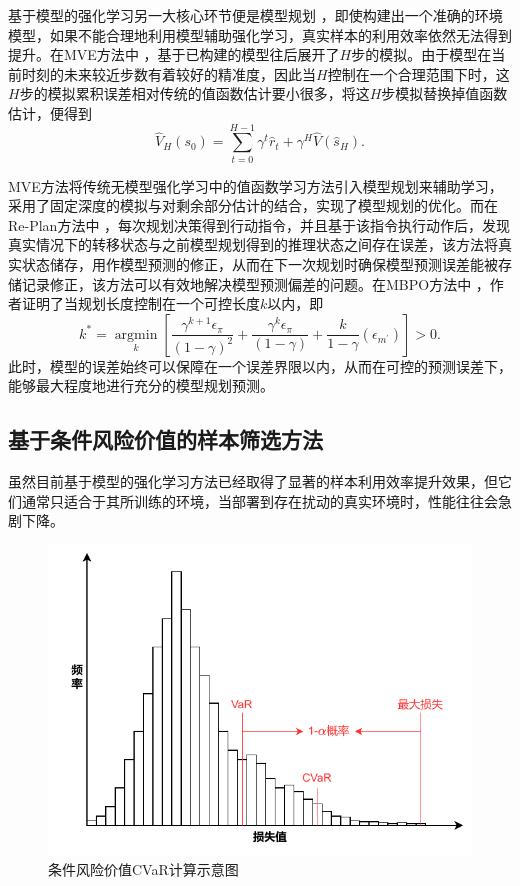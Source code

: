 基于模型的强化学习另一大核心环节便是模型规划 \cite{walsh2010integrating}，即使构建出一个准确的环境模型，如果不能合理地利用模型辅助强化学习，真实样本的利用效率依然无法得到提升。在MVE方法\cite{feinberg2018model}中 ，基于已构建的模型往后展开了$H$步的模拟。由于模型在当前时刻的未来较近步数有着较好的精准度，因此当$H$控制在一个合理范围下时，这$H$步的模拟累积误差相对传统的值函数估计要小很多，将这$H$步模拟替换掉值函数估计，便得到
\begin{equation}
    \widehat{V}_{H}\left(s_{0}\right)=\sum_{t=0}^{H-1} \gamma^{t} \hat{r}_{t}+\gamma^{H} \widehat{V}\left(\hat{s}_{H}\right).
\end{equation}

MVE方法将传统无模型强化学习中的值函数学习方法引入模型规划来辅助学习，采用了固定深度的模拟与对剩余部分估计的结合，实现了模型规划的优化。而在Re-Plan方法中 \cite{williams2017information}，每次规划决策得到行动指令，并且基于该指令执行动作后，发现真实情况下的转移状态与之前模型规划得到的推理状态之间存在误差，该方法将真实状态储存，用作模型预测的修正，从而在下一次规划时确保模型预测误差能被存储记录修正，该方法可以有效地解决模型预测偏差的问题。在MBPO方法中 \cite{janner2019trust}，作者证明了当规划长度控制在一个可控长度$k$以内，即
\begin{equation}
k^{*}=\underset{k}{\operatorname{argmin}}\left[\frac{\gamma^{k+1} \epsilon_{\pi}}{(1-\gamma)^{2}}+\frac{\gamma^{k} \epsilon_{\pi}}{(1-\gamma)}+\frac{k}{1-\gamma}\left(\epsilon_{m^{\prime}}\right)\right]>0.
\end{equation}
此时，模型的误差始终可以保障在一个误差界限以内，从而在可控的预测误差下，能够最大程度地进行充分的模型规划预测。

\subsection{基于条件风险价值的样本筛选方法}

虽然目前基于模型的强化学习方法已经取得了显著的样本利用效率提升效果，但它们通常只适合于其所训练的环境，当部署到存在扰动的真实环境时，性能往往会急剧下降。

\begin{figure}
  \centering
  \includegraphics[width=\linewidth]{figures/CVaR.pdf}
  \caption{条件风险价值CVaR计算示意图}
  \label{fig:cvar}
\end{figure}

